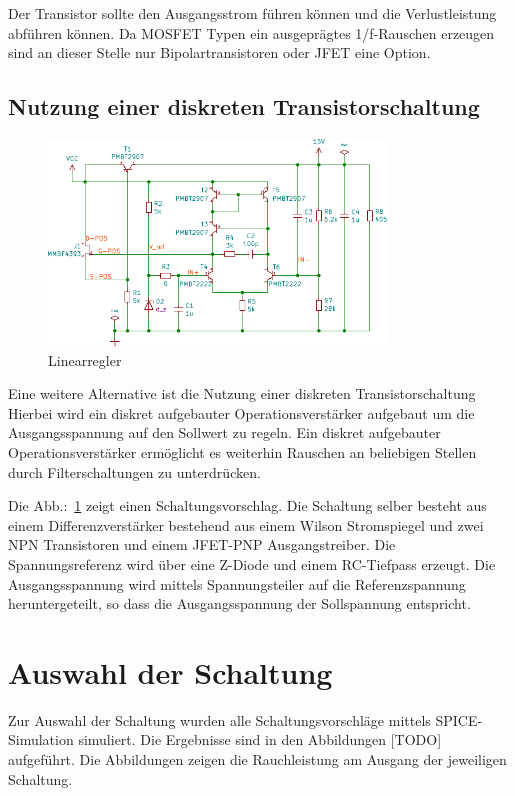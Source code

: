 Der Transistor sollte den Ausgangsstrom führen können und die Verlustleistung
abführen können.
Da MOSFET Typen ein ausgeprägtes 1/f-Rauschen erzeugen sind an dieser 
Stelle nur Bipolartransistoren oder JFET eine Option.

\subsection{Nutzung einer diskreten Transistorschaltung}
\begin{figure}
  \centering
  \includegraphics[clip, width=0.80\textwidth]{./../common/schaltungen/reg.pdf}
  \caption{Linearregler}\label{FIG:REG}
\end{figure}
Eine weitere Alternative ist die Nutzung einer diskreten Transistorschaltung
Hierbei wird ein diskret aufgebauter Operationsverstärker aufgebaut um
die Ausgangsspannung auf den Sollwert zu regeln.
Ein diskret aufgebauter Operationsverstärker ermöglicht es weiterhin Rauschen
an beliebigen Stellen durch Filterschaltungen zu unterdrücken.

Die Abb.:~\ref{FIG:REG} zeigt einen Schaltungsvorschlag.
Die Schaltung selber besteht aus einem Differenzverstärker bestehend aus einem
Wilson Stromspiegel und zwei NPN Transistoren und einem JFET-PNP 
Ausgangstreiber.
Die Spannungsreferenz wird über eine Z-Diode und einem RC-Tiefpass erzeugt.
Die Ausgangsspannung wird mittels Spannungsteiler auf die Referenzspannung 
heruntergeteilt, so dass die Ausgangsspannung der Sollspannung entspricht.
 
\section{Auswahl der Schaltung}
Zur Auswahl der Schaltung wurden alle Schaltungsvorschläge mittels 
SPICE-Simulation simuliert. Die Ergebnisse sind in den Abbildungen [TODO] 
aufgeführt.
Die Abbildungen zeigen die Rauchleistung am Ausgang der jeweiligen Schaltung.

